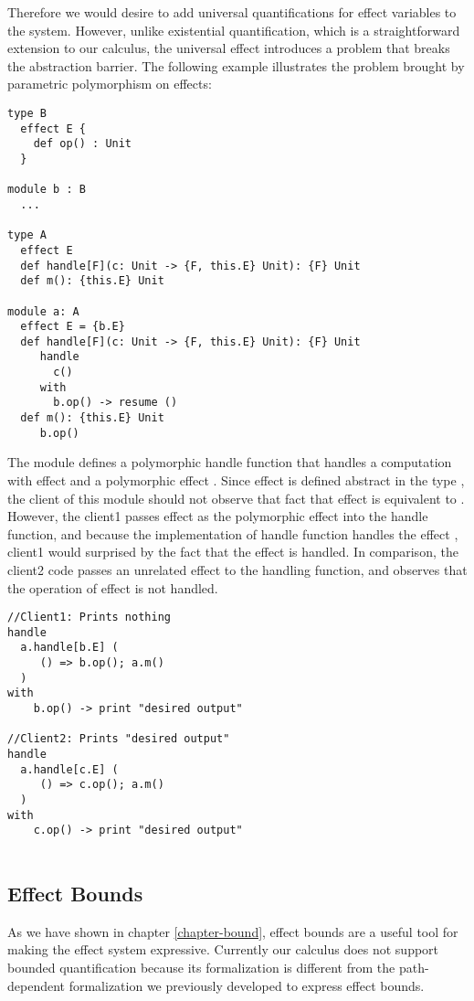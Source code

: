 Therefore we would desire to add universal quantifications for effect variables to the system. However, unlike existential quantification, which is a straightforward extension to our calculus, the universal effect introduces a problem that breaks the abstraction barrier. The following example illustrates the problem brought by parametric polymorphism on effects:

\begin{lstlisting}
type B
  effect E {
  	def op() : Unit
  }

module b : B
  ...

type A
  effect E 
  def handle[F](c: Unit -> {F, this.E} Unit): {F} Unit
  def m(): {this.E} Unit
  
module a: A
  effect E = {b.E}
  def handle[F](c: Unit -> {F, this.E} Unit): {F} Unit
     handle
       c()
     with
       b.op() -> resume ()
  def m(): {this.E} Unit
     b.op()
  \end{lstlisting}

The module  defines a polymorphic handle function that handles a computation with effect  and a polymorphic effect . Since effect  is defined abstract in the type , the client of this module should not observe that fact that effect  is equivalent to . However, the client1 passes effect  as the polymorphic effect into the handle function, and because the implementation of  handle function handles the effect , client1 would surprised by the fact that the effect  is handled. In comparison, the client2 code passes an unrelated effect  to the handling function, and observes that the operation of effect  is not handled.

\begin{lstlisting}
//Client1: Prints nothing
handle 
  a.handle[b.E] (
     () => b.op(); a.m()
  )
with
    b.op() -> print "desired output"

//Client2: Prints "desired output"
handle 
  a.handle[c.E] (
     () => c.op(); a.m()
  )
with
    c.op() -> print "desired output"
    
\end{lstlisting}


\subsection{Effect Bounds}
As we have shown in chapter \ref{chapter-bound}, effect bounds are a useful tool for making the effect system expressive. Currently our calculus does not support bounded quantification because its formalization is different from the path-dependent formalization we previously developed to express effect bounds. 

